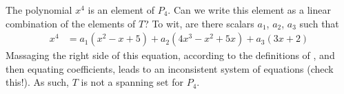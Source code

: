 The polynomial $x^4$ is an element of $P_4$.  Can we write this element as a linear combination of the elements of $T$?  To wit, are there scalars $a_1$, $a_2$, $a_3$ such that
\begin{align*}
x^4&=a_1\left(x^2-x+5\right)+a_2\left(4x^3-x^2+5x\right)+a_3\left(3x+2\right)
\end{align*}
%
Massaging the right side of this equation, according to the definitions of , and then equating coefficients, leads to an inconsistent system of equations (check this!).  As such, $T$ is not a spanning set for $P_4$.
